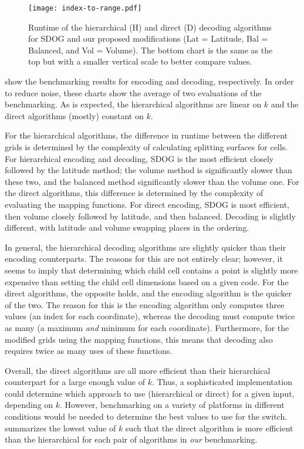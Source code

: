 \begin{figure}[htp!]
	\centering
	\texttt{[image: index-to-range.pdf]}
	\caption[Runtime comparison of SDOG decoding algorithms]{
		Runtime of the hierarchical (H) and direct (D) decoding algorithms for SDOG and our proposed modifications (Lat = Latitude, Bal = Balanced, and Vol = Volume).
		The bottom chart is the same as the top but with a smaller vertical scale to better compare values.
	}
	\label{fig:index-to-range}
\end{figure}


 show the benchmarking results for encoding and decoding, respectively.
In order to reduce noise, these charts show the average of two evaluations of the benchmarking.
As is expected, the hierarchical algorithms are linear on $k$ and the direct algorithms (mostly) constant on $k$.


For the hierarchical algorithms, the difference in runtime between the different grids is determined by the complexity of calculating splitting surfaces for cells.
For hierarchical encoding and decoding, SDOG is the most efficient closely followed by the latitude method; the volume method is significantly slower than these two, and the balanced method significantly slower than the volume one.
For the direct algorithms, this difference is determined by the complexity of evaluating the mapping functions.
For direct encoding, SDOG is most efficient, then volume closely followed by latitude, and then balanced.
Decoding is slightly different, with latitude and volume swapping places in the ordering.


In general, the hierarchical decoding algorithms are slightly quicker than their encoding counterparts.
The reasons for this are not entirely clear; however, it seems to imply that determining which child cell contains a point is slightly more expensive than setting the child cell dimensions based on a given code.
For the direct algorithms, the opposite holds, and the encoding algorithm is the quicker of the two.
The reason for this is the encoding algorithm only computes three values (an index for each coordinate), whereas the decoding must compute twice as many (a maximum \textit{and} minimum for each coordinate).
Furthermore, for the modified grids using the mapping functions, this means that decoding also requires twice as many uses of these functions.


Overall, the direct algorithms are all more efficient than their hierarchical counterpart for a large enough value of $k$.
Thus, a sophisticated implementation could determine which approach to use (hierarchical or direct) for a given input, depending on $k$.
However, benchmarking on a variety of platforms in different conditions would be needed to determine the best values to use for the switch.
 summarizes the lowest value of $k$ such that the direct algorithm is more efficient than the hierarchical for each pair of algorithms in \textit{our} benchmarking.


